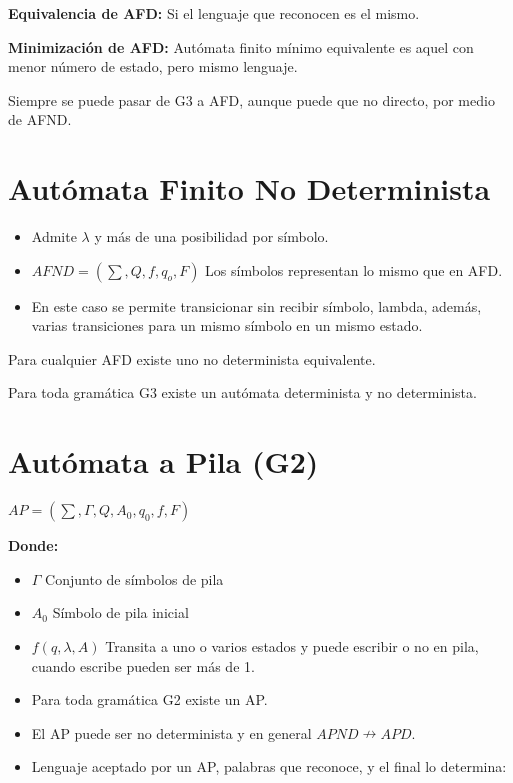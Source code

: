 \documentclass[12pt, twoside, openright]{report} %
\begin{document}
\textbf{Equivalencia de AFD:} Si el lenguaje que reconocen es el mismo.

\textbf{Minimización de AFD:} Autómata finito mínimo equivalente es
aquel con menor número de estado, pero mismo lenguaje.

Siempre se puede pasar de G3 a AFD, aunque puede que no directo, por
medio de AFND.


\section{Autómata Finito No Determinista}

\begin{itemize}
	\item Admite \(\lambda\) y más de una posibilidad por símbolo.
	\item \(AFND=( \sum, Q, f, q_o, F)\) Los símbolos representan lo mismo que
	      en AFD.
	\item En este caso se permite transicionar sin recibir símbolo, lambda,
	      además, varias transiciones para un mismo símbolo en un mismo estado.
\end{itemize}

Para cualquier AFD existe uno no determinista equivalente.

Para toda gramática G3 existe un autómata determinista y no
determinista.


\section{Autómata a Pila (G2)}

\(AP=(\sum, \Gamma, Q, A_0, q_0, f, F)\)

\textbf{Donde:}

\begin{itemize}
	\item \(\Gamma\) Conjunto de símbolos de pila
	\item \(A_0\) Símbolo de pila inicial
	\item \(f(q,\lambda,A)\) Transita a uno o varios estados y puede escribir o
	      no en pila, cuando escribe pueden ser más de 1.
	\item Para toda gramática G2 existe un AP.
	\item El AP puede ser no determinista y en general
	      \(APND \nrightarrow APD\).
	\item Lenguaje aceptado por un AP, palabras que reconoce, y el final lo
	      determina:
\end{itemize}
\end{document}
